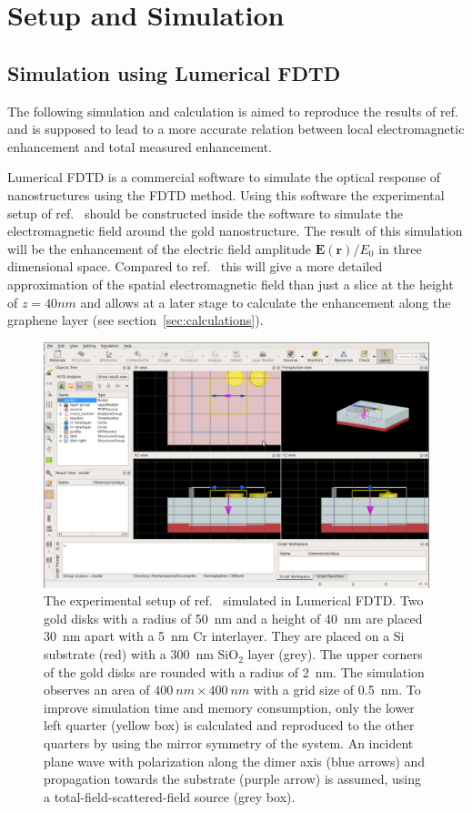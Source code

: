 \newpage
\section{Setup and Simulation}
\label{sec:simulation}
\subsection{Simulation using Lumerical FDTD}

The following simulation and calculation is aimed to reproduce the results of ref.~\cite{heeg} and is supposed to lead to a more accurate relation between local electromagnetic enhancement and total measured enhancement.

Lumerical FDTD is a commercial software to simulate the optical response of nanostructures using the FDTD method. Using this software the experimental setup of ref.~\cite{heeg} should be constructed inside the software to simulate the electromagnetic field around the gold nanostructure. The result of this simulation will be the enhancement of the electric field amplitude $\mathbf{E}(\mathbf{r})/E_0$ in three dimensional space. Compared to ref.~\cite{heeg} this will give a more detailed approximation of the spatial electromagnetic field than just a slice at the height of $z=40nm$ and allows at a later stage to calculate the enhancement along the graphene layer (see section~\ref{sec:calculations}).

\begin{figure}[!h]
  \includegraphics[width=\textwidth]{./images/lumerical.png}
  \caption{The experimental setup of ref.~\cite{heeg} simulated in Lumerical FDTD. Two gold disks with a radius of \SI{50}{nm} and a height of \SI{40}{nm} are placed \SI{30}{nm} apart with a \SI{5}{nm} Cr interlayer. They are placed on a Si substrate (red) with a \SI{300}{nm} SiO$_2$ layer (grey). The upper corners of the gold disks are rounded with a radius of \SI{2}{nm}. The simulation observes an area of $\SI{400}{nm}\times\SI{400}{nm}$ with a grid size of \SI{0.5}{nm}. To improve simulation time and memory consumption, only the lower left quarter (yellow box) is calculated and reproduced to the other quarters by using the mirror symmetry of the system. An incident plane wave with polarization along the dimer axis (blue arrows) and propagation towards the substrate (purple arrow) is assumed, using a total-field-scattered-field source (grey box).}
  \label{fig:lumerical}
\end{figure}

